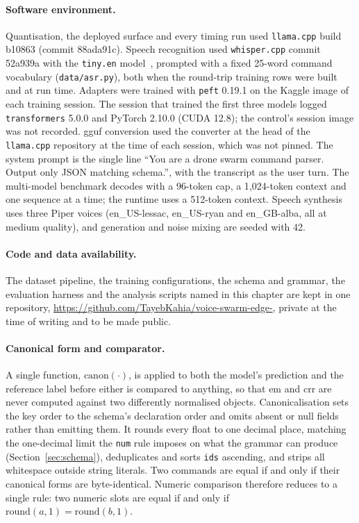 \paragraph{Software environment.} Quantisation, the deployed surface and every timing run used
\texttt{llama.cpp} build b10863 (commit 88ada91c). Speech recognition used \texttt{whisper.cpp}
commit 52a939a with the \texttt{tiny.en} model~\cite{whisper}, prompted with a fixed 25-word command
vocabulary (\texttt{data/asr.py}), both when the round-trip training rows were built and at run
time. Adapters were trained with \texttt{peft} 0.19.1 on the Kaggle image of each training session.
The session that trained the first three models logged \texttt{transformers} 5.0.0 and PyTorch
2.10.0 (CUDA 12.8); the control's session image was not recorded. \gls{gguf} conversion used the
converter at the head of the \texttt{llama.cpp} repository at the time of each session, which was
not pinned. The system prompt is the single line ``You are a drone swarm command parser. Output only
JSON matching schema.'', with the transcript as the user turn. The multi-model benchmark decodes
with a 96-token cap, a 1{,}024-token context and one sequence at a time; the runtime uses a
512-token context. Speech synthesis uses three Piper voices (en\_US-lessac,
en\_US-ryan and en\_GB-alba, all at medium quality), and generation and noise mixing are seeded
with 42.

\paragraph{Code and data availability.} The dataset pipeline, the training configurations, the
schema and grammar, the evaluation harness and the analysis scripts named in this chapter are
kept in one repository, \url{https://github.com/TayebKahia/voice-swarm-edge-}, private at the
time of writing and to be made public.

\paragraph{Canonical form and comparator.} A single function, $\mathrm{canon}(\cdot)$, is applied to
both the model's prediction and the reference label before either is compared to anything, so that
\gls{em} and \gls{crr} are never computed against two differently normalised
objects. Canonicalisation sets the key order to the schema's declaration order and omits absent or null
fields rather than emitting them. It rounds every float to one decimal place, matching the
one-decimal limit the \texttt{num} rule imposes on what the grammar can produce
(Section~\ref{sec:schema}), deduplicates and sorts \texttt{ids} ascending, and strips all
whitespace outside string literals. Two commands are equal if and only if their canonical forms are
byte-identical. Numeric comparison therefore reduces to a single rule: two numeric slots are equal if
and only if $\mathrm{round}(a,1) = \mathrm{round}(b,1)$.

